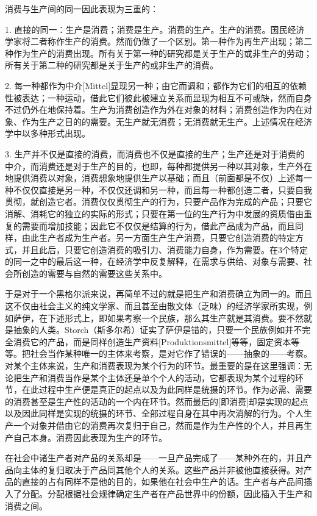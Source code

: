 \documentclass[a5paper,twoside,10.5pt]{ctexart}
\begin{document}
消费与生产间的同一因此表现为三重的：

1. 直接的同一：生产是消费；消费是生产。消费的生产。生产的消费。国民经济学家将二者称作生产的消费。然而仍做了一个区别。第一种作为再生产出现；第二种作为生产的消费出现。所有关于第一种的研究都是关于生产的或非生产的劳动；所有关于第二种的研究都是关于生产的或非生产的消费。

2. 每一种都作为中介[Mittel]显现另一种；由它而调和；都作为它们的相互的依赖性被表达；一种运动，借此它们彼此被建立关系而显现为相互不可或缺，然而自身不过仍外在地保持着。生产为消费创造作为外在对象的材料；消费创造作为内在对象、作为生产之目的的需要。无生产就无消费；无消费就无生产。上述情况在经济学中以多种形式出现。

3. 生产并不仅是直接的消费，而消费也不仅是直接的生产；生产还是对于消费的中介，而消费还是对于生产的目的，也即，每种都提供另一种以其对象，生产外在地提供消费以对象，消费想象地提供生产以基础；而且（前面都是不仅）上述每一种不仅仅直接是另一种，不仅仅还调和另一种，而且每一种都创造二者，只要自我贯彻，就创造它者。消费仅仅贯彻生产的行为，只要产品作为完成的产品；只要它消解、消耗它的独立的实际的形式；只要在第一位的生产行为中发展的资质借由重复的需要而增加技能；因此它不仅仅是结算的行为，借此产品成为产品，而且同样，由此生产者成为生产者。另一方面生产生产消费，只要它创造消费的特定方式，并且此后，只要它创造消费的吸引力、消费能力自身，作为需要。在3个特定的同一之中的最后这一种，在经济学中反复解释，在需求与供给、对象与需要、社会所创造的需要与自然的需要这些关系中。

于是对于一个黑格尔派来说，再简单不过的就是把生产和消费确立为同一的。而且这不仅由社会主义的纯文学家、而且甚至由散文体（乏味）的经济学家所实现，例如萨伊，在下述形式上，即如果考察一个民族，那么其生产就是其消费。要不然就是抽象的人类。Storch（斯多尔希）证实了萨伊是错的，只要一个民族例如并不完全消费它的产品，而是同样创造生产资料[Produktionsmittel]等等，固定资本等等。把社会当作某种唯一的主体来考察，是对它作了错误的——抽象的——考察。对某个主体来说，生产和消费表现为某个行为的环节。最重要的是在这里强调：无论把生产和消费当作是某个主体还是单个个人的活动，它都表现为某个过程的环节，在此过程中生产便是真正的起点以及为此同样是统摄的环节。作为必需、需要的消费甚至是生产性的活动的一个内在环节。然而最后的[即消费]却是实现的起点以及因此同样是实现的统摄的环节、全部过程自身在其中再次消解的行为。个人生产一个对象并借由它的消费再次复归于自己，然而是作为生产性的个人，并且再生产自己本身。消费因此表现为生产的环节。

在社会中诸生产者对产品的关系却是——一旦产品完成了——某种外在的，并且产品向主体的复归取决于产品同其他个人的关系。这些产品并非被他直接获得。对产品的直接的占有同样不是他的目的，如果他在社会中生产的话。生产者与产品间插入了分配。分配根据社会规律确定生产者在产品世界中的份额，因此插入于生产和消费之间。
\end{document}
